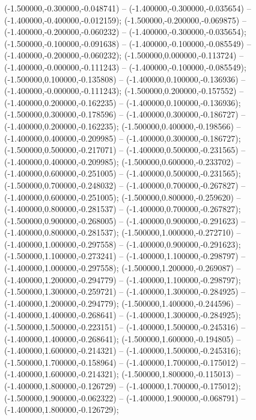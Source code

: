  (-1.500000,-0.300000,-0.048741) -- (-1.400000,-0.300000,-0.035654) -- (-1.400000,-0.400000,-0.012159);
 (-1.500000,-0.200000,-0.069875) -- (-1.400000,-0.200000,-0.060232) -- (-1.400000,-0.300000,-0.035654);
 (-1.500000,-0.100000,-0.091638) -- (-1.400000,-0.100000,-0.085549) -- (-1.400000,-0.200000,-0.060232);
 (-1.500000,0.000000,-0.113724) -- (-1.400000,-0.000000,-0.111243) -- (-1.400000,-0.100000,-0.085549);
 (-1.500000,0.100000,-0.135808) -- (-1.400000,0.100000,-0.136936) -- (-1.400000,-0.000000,-0.111243);
 (-1.500000,0.200000,-0.157552) -- (-1.400000,0.200000,-0.162235) -- (-1.400000,0.100000,-0.136936);
 (-1.500000,0.300000,-0.178596) -- (-1.400000,0.300000,-0.186727) -- (-1.400000,0.200000,-0.162235);
 (-1.500000,0.400000,-0.198566) -- (-1.400000,0.400000,-0.209985) -- (-1.400000,0.300000,-0.186727);
 (-1.500000,0.500000,-0.217071) -- (-1.400000,0.500000,-0.231565) -- (-1.400000,0.400000,-0.209985);
 (-1.500000,0.600000,-0.233702) -- (-1.400000,0.600000,-0.251005) -- (-1.400000,0.500000,-0.231565);
 (-1.500000,0.700000,-0.248032) -- (-1.400000,0.700000,-0.267827) -- (-1.400000,0.600000,-0.251005);
 (-1.500000,0.800000,-0.259620) -- (-1.400000,0.800000,-0.281537) -- (-1.400000,0.700000,-0.267827);
 (-1.500000,0.900000,-0.268005) -- (-1.400000,0.900000,-0.291623) -- (-1.400000,0.800000,-0.281537);
 (-1.500000,1.000000,-0.272710) -- (-1.400000,1.000000,-0.297558) -- (-1.400000,0.900000,-0.291623);
 (-1.500000,1.100000,-0.273241) -- (-1.400000,1.100000,-0.298797) -- (-1.400000,1.000000,-0.297558);
 (-1.500000,1.200000,-0.269087) -- (-1.400000,1.200000,-0.294779) -- (-1.400000,1.100000,-0.298797);
 (-1.500000,1.300000,-0.259721) -- (-1.400000,1.300000,-0.284925) -- (-1.400000,1.200000,-0.294779);
 (-1.500000,1.400000,-0.244596) -- (-1.400000,1.400000,-0.268641) -- (-1.400000,1.300000,-0.284925);
 (-1.500000,1.500000,-0.223151) -- (-1.400000,1.500000,-0.245316) -- (-1.400000,1.400000,-0.268641);
 (-1.500000,1.600000,-0.194805) -- (-1.400000,1.600000,-0.214321) -- (-1.400000,1.500000,-0.245316);
 (-1.500000,1.700000,-0.158964) -- (-1.400000,1.700000,-0.175012) -- (-1.400000,1.600000,-0.214321);
 (-1.500000,1.800000,-0.115013) -- (-1.400000,1.800000,-0.126729) -- (-1.400000,1.700000,-0.175012);
 (-1.500000,1.900000,-0.062322) -- (-1.400000,1.900000,-0.068791) -- (-1.400000,1.800000,-0.126729);
